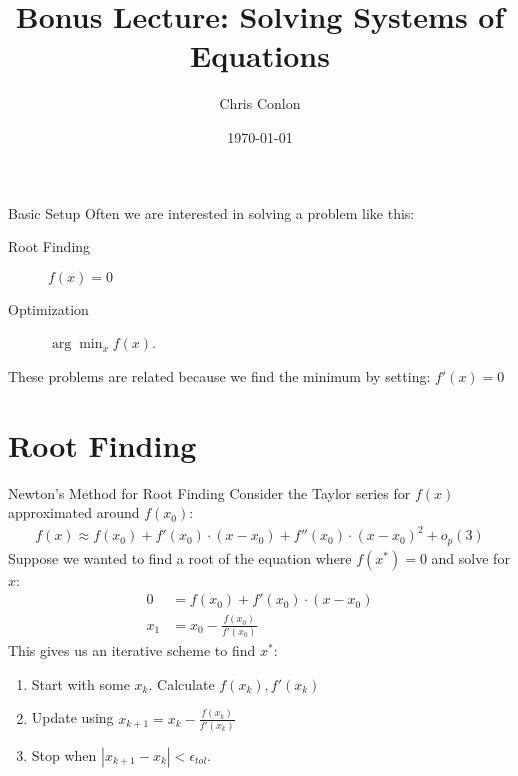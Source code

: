 \documentclass[xcolor=pdftex,dvipsnames,table,mathserif,aspectratio=169]{beamer}
\title{Bonus Lecture: Solving Systems of Equations}
\author{Chris Conlon  }
\institute{Grad IO}
\date{\today }
\begin{document}
\begin{frame}
\titlepage
\end{frame}

\begin{frame}{Basic Setup}
Often we are interested in solving a problem like this:
\begin{description}
\item[Root Finding] $f(x) = 0 $
\item[Optimization] $\arg \min_x f(x)$.
\end{description}
These problems are related because we find the minimum by setting: $f'(x)=0$
\end{frame}

\section{Root Finding} 

\begin{frame}{Newton's Method for Root Finding}
Consider the Taylor series for $f(x)$ approximated around $f(x_0)$:
\begin{align*}
f(x) \approx f(x_0) + f'(x_0) \cdot (x-x_0) + f''(x_0) \cdot (x-x_0)^2 + o_p(3)
\end{align*}
Suppose we wanted to find a \alert{root} of the equation where $f(x^{*})=0$ and solve for $x$:
\begin{align*}
0 &= f(x_0) + f'(x_0) \cdot (x-x_0) \\
x_1 &= x_0-\frac{f(x_0)}{f'(x_0)} 
\end{align*}
This gives us an \alert{iterative} scheme to find $x^{*}$:
\begin{enumerate}
\item Start with some $x_k$. Calculate $f(x_k),f'(x_k)$
\item Update using $x_{k+1} = x_k - \frac{f(x_k)}{f'(x_k)} $
\item Stop when $|x_{k+1}-x_{k}| < \epsilon_{tol}$.
\end{enumerate}
\end{frame}
\end{document}
